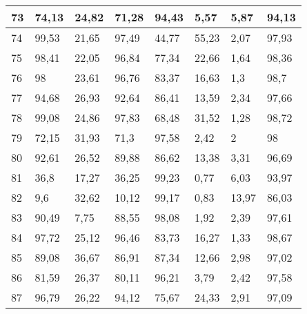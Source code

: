 \begin{longtable}[c]{|l|l|l|l|l|l|l|l|}
73              & 74,13        & 24,82        & 71,28       & 94,43         & 5,57          & 5,87          & 94,13         \\ \hline
74              & 99,53        & 21,65        & 97,49       & 44,77         & 55,23         & 2,07          & 97,93         \\ \hline
75              & 98,41        & 22,05        & 96,84       & 77,34         & 22,66         & 1,64          & 98,36         \\ \hline
76              & 98           & 23,61        & 96,76       & 83,37         & 16,63         & 1,3           & 98,7          \\ \hline
77              & 94,68        & 26,93        & 92,64       & 86,41         & 13,59         & 2,34          & 97,66         \\ \hline
78              & 99,08        & 24,86        & 97,83       & 68,48         & 31,52         & 1,28          & 98,72         \\ \hline
79              & 72,15        & 31,93        & 71,3        & 97,58         & 2,42          & 2             & 98            \\ \hline
80              & 92,61        & 26,52        & 89,88       & 86,62         & 13,38         & 3,31          & 96,69         \\ \hline
81              & 36,8         & 17,27        & 36,25       & 99,23         & 0,77          & 6,03          & 93,97         \\ \hline
82              & 9,6          & 32,62        & 10,12       & 99,17         & 0,83          & 13,97         & 86,03         \\ \hline
83              & 90,49        & 7,75         & 88,55       & 98,08         & 1,92          & 2,39          & 97,61         \\ \hline
84              & 97,72        & 25,12        & 96,46       & 83,73         & 16,27         & 1,33          & 98,67         \\ \hline
85              & 89,08        & 36,67        & 86,91       & 87,34         & 12,66         & 2,98          & 97,02         \\ \hline
86              & 81,59        & 26,37        & 80,11       & 96,21         & 3,79          & 2,42          & 97,58         \\ \hline
87              & 96,79        & 26,22        & 94,12       & 75,67         & 24,33         & 2,91          & 97,09         \\ \hline

\end{longtable}
